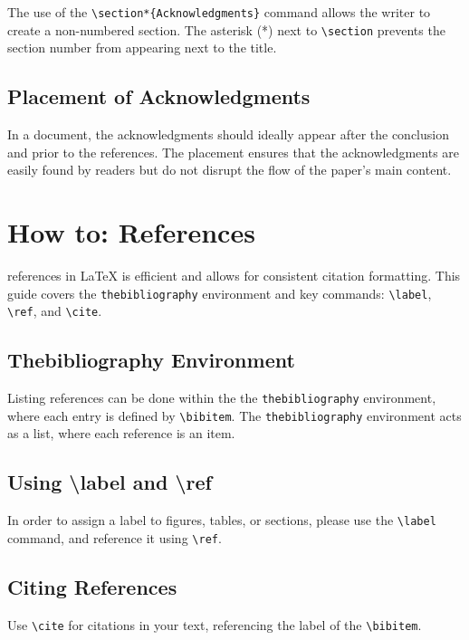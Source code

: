 \documentclass[12pt,journal,compsoc]{IEEEtran}
\begin{document}
The use of the \texttt{\textbackslash section*\{Acknowledgments\}} command allows the writer to create a non-numbered section. The asterisk (*) next to \texttt{\textbackslash section} prevents the section number from appearing next to the title.

\subsection*{Placement of Acknowledgments}

In a document, the acknowledgments should ideally appear after the conclusion and prior to the references. The placement ensures that the acknowledgments are easily found by readers but do not disrupt the flow of the paper's main content.

\section{How to: References}

 references in \LaTeX{} is efficient and allows for consistent citation formatting. This guide covers the \texttt{thebibliography} environment and key commands: \texttt{\textbackslash label}, \texttt{\textbackslash ref}, and \texttt{\textbackslash cite}.

\subsection{Thebibliography Environment}
Listing references can be done within the the \texttt{thebibliography} environment, where each entry is defined by \texttt{\textbackslash bibitem}. The \texttt{thebibliography} environment acts as a list, where each reference is an item.

\subsection{Using \textbackslash label and \textbackslash ref}
In order to assign a label to figures, tables, or sections, please use the \texttt{\textbackslash label} command, and reference it using \texttt{\textbackslash ref}.

\subsection{Citing References}
Use \texttt{\textbackslash cite} for citations in your text, referencing the label of the \texttt{\textbackslash bibitem}. 
\end{document}
